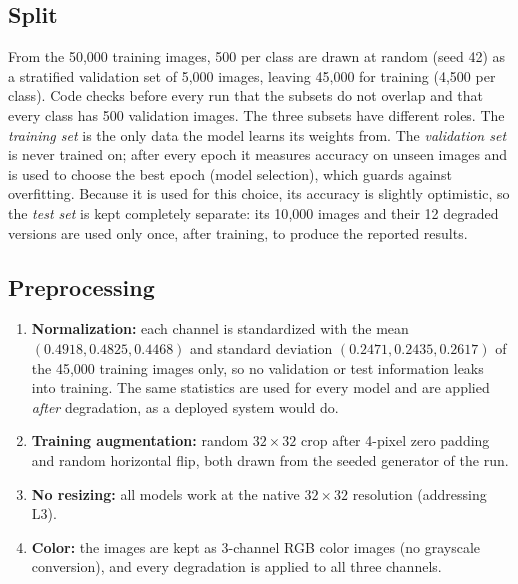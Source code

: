 \documentclass[conference]{IEEEtran}
\begin{document}
\subsection{Split}
From the 50{,}000 training images, 500 per class are drawn at random (seed 42) as a stratified validation set of 5{,}000 images, leaving 45{,}000 for training (4{,}500 per class). Code checks before every run that the subsets do not overlap and that every class has 500 validation images. The three subsets have different roles. The \emph{training set} is the only data the model learns its weights from. The \emph{validation set} is never trained on; after every epoch it measures accuracy on unseen images and is used to choose the best epoch (model selection), which guards against overfitting. Because it is used for this choice, its accuracy is slightly optimistic, so the \emph{test set} is kept completely separate: its 10{,}000 images and their 12 degraded versions are used only once, after training, to produce the reported results.

\subsection{Preprocessing}
\begin{enumerate}
\item \textbf{Normalization:} each channel is standardized with the mean $(0.4918, 0.4825, 0.4468)$ and standard deviation $(0.2471, 0.2435, 0.2617)$ of the 45{,}000 training images only, so no validation or test information leaks into training. The same statistics are used for every model and are applied \emph{after} degradation, as a deployed system would do.
\item \textbf{Training augmentation:} random $32\times32$ crop after 4-pixel zero padding and random horizontal flip, both drawn from the seeded generator of the run.
\item \textbf{No resizing:} all models work at the native $32\times32$ resolution (addressing L3).
\item \textbf{Color:} the images are kept as 3-channel RGB color images (no grayscale conversion), and every degradation is applied to all three channels.
\end{enumerate}
\end{document}
